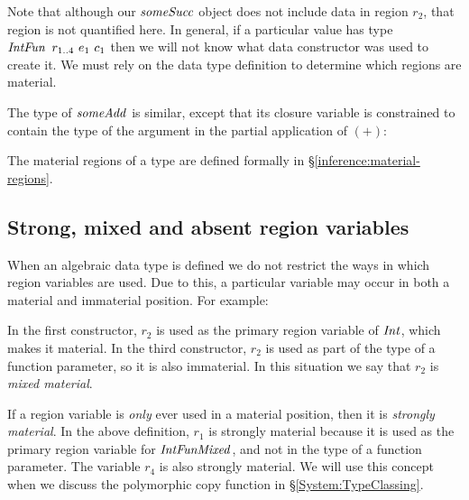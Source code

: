
Note that although our $\operatorname{\mathit{someSucc}}$ object does not include data in region $r_2$, that region is not quantified here. In general, if a particular value has type $\iIntFun \ r_{1..4} \ e_1 \ c_1$ then we will not know what data constructor was used to create it. We must rely on the data type definition to determine which regions are material.

The type of $\operatorname{\mathit{someAdd}}$ is similar, except that its closure variable is constrained to contain the type of the argument in the partial application of $(+)$:


The material regions of a type are defined formally in \S\ref{inference:material-regions}.

\clearpage{}
\subsection{Strong, mixed and absent region variables}
\label{System:Closure:strong-mixed-absent-variables}

When an algebraic data type is defined we do not restrict the ways in which region variables are used. Due to this, a particular variable may occur in both a material and immaterial position. For example:


In the first constructor, $r_2$ is used as the primary region variable of $\operatorname{\mathit{Int}}$, which makes it material. In the third constructor, $r_2$ is used as part of the type of a function parameter, so it is also immaterial. In this situation we say that $r_2$ is \emph{mixed material}.

If a region variable is \emph{only} ever used in a material position, then it is \emph{strongly material}. In the above definition, $r_1$ is strongly material because it is used as the primary region variable for $\operatorname{\mathit{IntFunMixed}}$, and not in the type of a function parameter. The variable $r_4$ is also strongly material. We will use this concept when we discuss the polymorphic copy function in \S\ref{System:TypeClassing}. 

